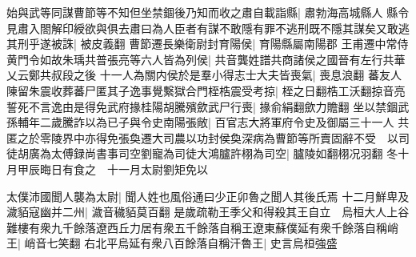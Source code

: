 始與武等同謀曹節等不知但坐禁錮後乃知而收之肅自載詣縣|{
	肅勃海高城縣人}
縣令見肅入閤解印綬欲與俱去肅曰為人臣者有謀不敢隱有罪不逃刑既不隱其謀矣又敢逃其刑乎遂被誅|{
	被皮義翻}
曹節遷長樂衛尉封育陽侯|{
	育陽縣屬南陽郡}
王甫遷中常侍黄門令如故朱瑀共普張亮等六人皆為列侯|{
	共音龔姓譜共商諸侯之國晉有左行共華乂云鄭共叔段之後}
十一人為關内侯於是羣小得志士大夫皆喪氣|{
	喪息浪翻}
蕃友人陳留朱震收葬蕃尸匿其子逸事覺繫獄合門桎梏震受考掠|{
	桎之日翻梏工沃翻掠音亮}
誓死不言逸由是得免武府掾桂陽胡騰殯歛武尸行喪|{
	掾俞絹翻歛力贍翻}
坐以禁錮武孫輔年二歲騰詐以為已子與令史南陽張敞|{
	百官志大將軍府令史及御屬三十一人}
共匿之於零陵界中亦得免張奐遷大司農以功封侯奐深病為曹節等所賣固辭不受　以司徒胡廣為太傅録尚書事司空劉寵為司徒大鴻臚許栩為司空|{
	臚陵如翻栩况羽翻}
冬十月甲辰晦日有食之　十一月太尉劉矩免以

太僕沛國聞人襲為太尉|{
	聞人姓也風俗通曰少正卯魯之聞人其後氏焉}
十二月鮮卑及濊貊寇幽并二州|{
	濊音穢貊莫百翻}
是歲疏勒王季父和得殺其王自立　烏桓大人上谷難樓有衆九千餘落遼西丘力居有衆五千餘落自稱王遼東蘇僕延有衆千餘落自稱峭王|{
	峭音七笑翻}
右北平烏延有衆八百餘落自稱汗魯王|{
	史言烏桓強盛}


